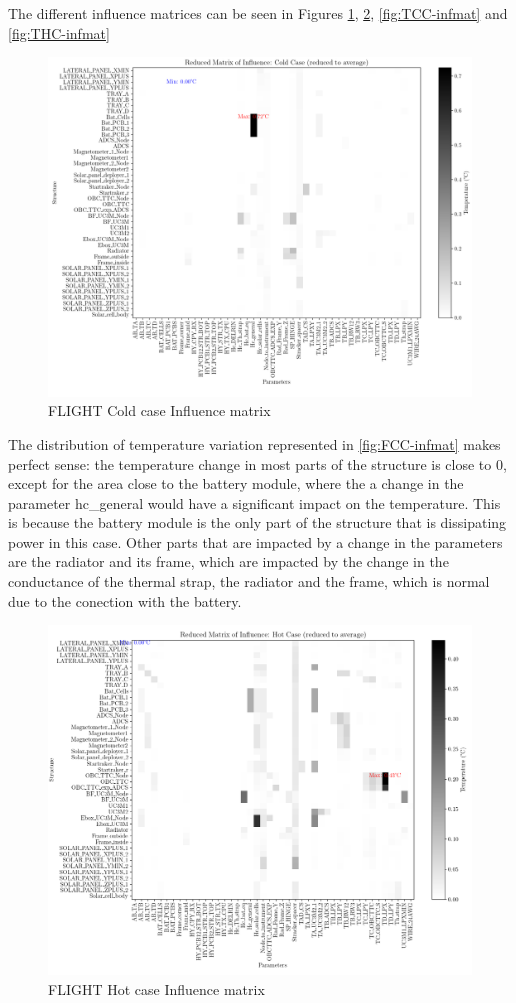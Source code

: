 The different influence matrices can be seen in Figures \ref{fig:FCC-infmat}, \ref{fig:FHC-infmat}, \ref{fig:TCC-infmat}  and \ref{fig:THC-infmat}
\begin{figure}[H]
    \centering
    \includegraphics[width = \linewidth]{Figures/UPMSat3/Flight/infmatCC-F.png}
    \caption{FLIGHT Cold case Influence matrix}
    \label{fig:FCC-infmat}
\end{figure}
The distribution of temperature variation represented in \autoref{fig:FCC-infmat} makes perfect sense: the temperature change in most parts of the structure is close to 0, except for the area close to the battery module, where the a change in the parameter hc\_general would have a significant impact on the temperature. This is because the battery module is the only part of the structure that is dissipating power in this case. Other parts that are impacted by a change in the parameters are the radiator and its frame, which are impacted by the change in the conductance of the thermal strap, the radiator and the frame, which is normal due to the conection with the battery.
\begin{figure}[H]
    \centering
    \includegraphics[width = \linewidth]{Figures/UPMSat3/Flight/infmatHC-F.png}
    \caption{FLIGHT Hot case Influence matrix}
    \label{fig:FHC-infmat}
\end{figure}
